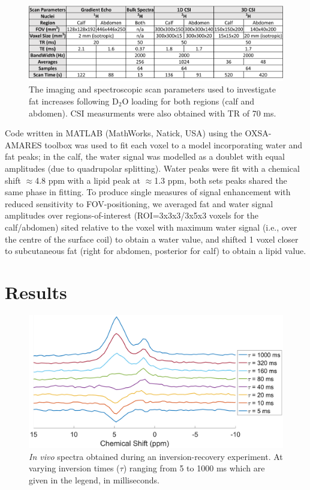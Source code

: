 \documentclass[class=article, crop=false]{standalone}
\begin{document}
\begin{figure}
    \centering
    \includegraphics[width=1\textwidth]{Figures/Lipid/Scan_Details.png}
    \caption{The imaging and spectroscopic scan parameters used to investigate fat increases following D$_2$O loading for both regions (calf and abdomen). CSI measurments were also obtained with TR of 70 ms.}
    \label{fig:Lip:Scan_Detail}
\end{figure}

Code written in MATLAB (MathWorks, Natick, USA) using the OXSA-AMARES\cite{Purvis2017OXSA:MATLAB} toolbox was used to fit each voxel to a model incorporating water and fat peaks; in the calf, the water signal was modelled as a doublet with equal amplitudes (due to quadrupolar splitting)\cite{Gursan2022ResidualMuscle}. Water peaks were fit with a chemical shift $\approx$4.8 ppm with a lipid peak at $\approx$1.3 ppm, both sets peaks shared the same phase in fitting. To produce single measures of signal enhancement with reduced sensitivity to FOV-positioning, we averaged fat and water signal amplitudes over regions-of-interest (ROI=3x3x3/3x5x3 voxels for the calf/abdomen) sited relative to the voxel with maximum water signal (i.e., over the centre of the surface coil) to obtain a water value, and shifted 1 voxel closer to subcutaneous fat (right for abdomen, posterior for calf) to obtain a lipid value.

\section{Results}

\begin{figure}
    \centering
    \includegraphics[width=1\textwidth]{Figures/Lipid/NA_IR.png}
    \caption{\textit{In vivo} spectra obtained during an inversion-recovery experiment. At varying inversion times ($\tau$) ranging from 5 to 1000 ms which are given in the legend, in milliseconds.}
    \label{fig:Lip:IR}
\end{figure}
\end{document}
